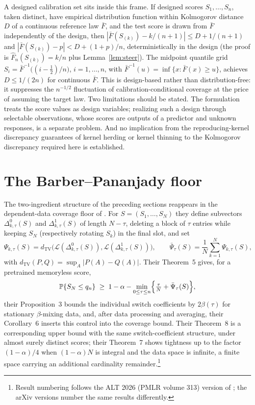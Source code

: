 \documentclass[11pt]{article}
\theoremstyle{remark}
\newcommand{\Prob}{\mathbb{P}}
\begin{document}
A designed calibration set sits inside this frame. If designed scores $S_1,\dots,S_n$, taken
distinct, have empirical distribution function within Kolmogorov distance $D$ of a continuous
reference law $\bar F$, and the test score is drawn from $\bar F$ independently of the design,
then $|\bar F(S_{(k)})-k/(n+1)|\le D+1/(n+1)$ and $|\bar F(S_{(k)})-p|<D+(1+p)/n$,
deterministically in the design (the proof is $\hat F_n(S_{(k)})=k/n$ plus
Lemma~\ref{lem:steer}). The midpoint quantile grid $S_i=\bar F^{-1}\bigl((i-\tfrac12)/n\bigr)$, $i=1,\dots,n$, with
$\bar F^{-1}(u)=\inf\{x:\bar F(x)\ge u\}$,
achieves $D\le 1/(2n)$ for continuous $\bar F$. This is design-based rather
than distribution-free: it suppresses the $n^{-1/2}$ fluctuation of calibration-conditional
coverage at the price of assuming the target law. Two limitations should be stated. The
formulation treats the score values as design variables; realizing such a design through
selectable observations, whose scores are outputs of a predictor and unknown responses, is a
separate problem. And no implication from the reproducing-kernel discrepancy guarantees of
kernel herding or kernel thinning \citep{chen2010,dwivedi2021} to the Kolmogorov discrepancy
required here is established.

\section{The Barber--Pananjady floor}\label{sec:bp}

The two-ingredient structure of the preceding sections reappears in the dependent-data coverage
floor of \citet{barberpananjady2026}. For $S=(S_1,\dots,S_{N})$ they define subvectors
$\Delta^{0}_{k,\tau}(S)$ and $\Delta^{1}_{k,\tau}(S)$ of length $N-\tau$, deleting a block of
$\tau$ entries while keeping $S_{N}$ (respectively rotating $S_k$) in the final slot, and set
\[
\Psi_{k,\tau}(S)=d_{\mathrm{TV}}\bigl(\mathcal L(\Delta^{0}_{k,\tau}(S)),
\mathcal L(\Delta^{1}_{k,\tau}(S))\bigr),
\qquad
\bar\Psi_\tau(S)=\frac1{N}\sum_{k=1}^{N}\Psi_{k,\tau}(S),
\]
with $d_{\mathrm{TV}}(P,Q)=\sup_A|P(A)-Q(A)|$. Their Theorem~5 gives, for a pretrained
memoryless score,
\[
\Prob\{S_{N}\le q_n\}\;\ge\;1-\alpha-\min_{0\le\tau\le n}
\Bigl\{\tfrac{\tau}{N}+\bar\Psi_\tau(S)\Bigr\},
\]
their Proposition~3 bounds the individual switch coefficients by $2\beta(\tau)$ for stationary
$\beta$-mixing data, and, after data processing and averaging, their Corollary~6 inserts this
control into the coverage bound. Their Theorem~8 is a corresponding upper bound with the same
switch-coefficient structure, under almost surely distinct scores; their Theorem~7 shows
tightness up to the factor $(1-\alpha)/4$ when $(1-\alpha)N$ is integral and the data space is
infinite, a finite space carrying an additional cardinality
remainder.\footnote{Result numbering follows the ALT 2026 (PMLR volume 313) version of
\citet{barberpananjady2026}; the arXiv versions number the same results differently.}
\end{document}
